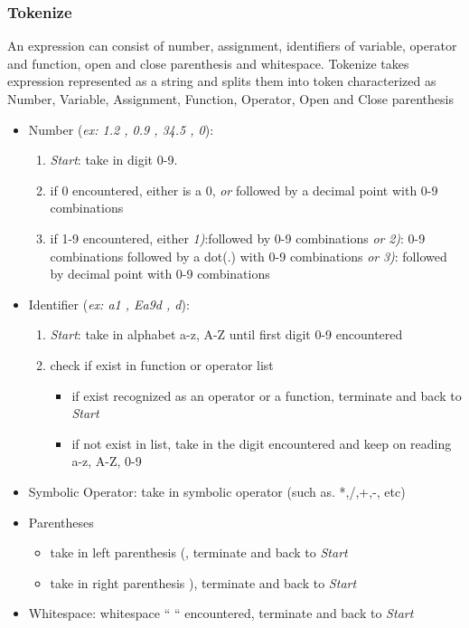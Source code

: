 \documentclass[12pt,a4paper]{article}
\begin{document}
\subsubsection{Tokenize}
\textnormal{An expression can consist of number, assignment, identifiers of variable, operator and function, open and close parenthesis and whitespace. Tokenize takes expression represented as a string and splits them into token characterized as Number, Variable, Assignment, Function, Operator, Open and Close parenthesis}
\begin{itemize}
\item Number (\textit{ex: 1.2 , 0.9 , 34.5 , 0}):
\begin {enumerate}
\item \emph{Start}: take in digit 0-9.
\item if 0 encountered, either is a 0, \emph{or} followed by a decimal point with 0-9 combinations
\item if 1-9 encountered, either \emph{1)}:followed by 0-9 combinations \emph{or} \emph{2)}: 0-9 combinations followed by a dot(.) with 0-9 combinations \emph{or} \emph{3)}: followed by decimal point with 0-9 combinations
\end{enumerate}
\item Identifier (\textit{ex: a1 , Ea9d , d}):
\begin {enumerate}
\item \emph{Start}: take in alphabet a-z, A-Z until first digit 0-9 encountered
\item check if exist in function or operator list
\begin {itemize}
\item if exist recognized as an operator or a function, terminate and back to \emph{Start}
\item if not exist in list, take in the digit encountered and keep on reading a-z, A-Z, 0-9
\end{itemize}
\end{enumerate}
\item Symbolic Operator: take in symbolic operator (such as. *,/,+,-, etc)
\item Parentheses
\begin{itemize}
\item take in left parenthesis (, terminate and back to \emph{Start}
\item take in right parenthesis ), terminate and back to \emph{Start}
\end{itemize}
\item Whitespace: whitespace “ “ encountered, terminate and back to \emph{Start}
  
\end{itemize}
\end{document}
